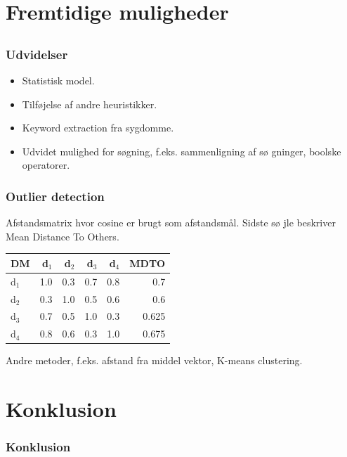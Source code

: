 \documentclass[xcolor=table]{beamer}
\begin{document}
\section{Fremtidige muligheder}

\subsection*{}

\begin{frame}

  \frametitle{Udvidelser}

  \begin{itemize}
    \item Statistisk model.
    \item Tilf\o jelse af andre heuristikker.
    \item Keyword extraction fra sygdomme.
    \item Udvidet mulighed for s\o gning, f.eks. sammenligning af s\o
      gninger, boolske operatorer.
  \end{itemize}

\end{frame}

\begin{frame}

  \frametitle{Outlier detection}

  Afstandsmatrix hvor cosine er brugt som afstandsm\aa l. Sidste s\o
  jle beskriver Mean Distance To Others.

  \begin{center}
    \begin{tabular}{|l|r|r|r|r|r|}
      \hline
      DM    & d$_1$ & d$_2$ & d$_3$ & d$_4$ & MDTO \\
      \hline
      d$_1$ &   1.0 &   0.3 &   0.7 &   0.8 & 0.7 \\
      \hline
      d$_2$ &   0.3 &   1.0 &   0.5 &   0.6 & 0.6 \\
      \hline
      d$_3$ &   0.7 &   0.5 &   1.0 &   0.3 & 0.625 \\
      \hline
      d$_4$ &   0.8 &   0.6 &   0.3 &   1.0 & 0.675 \\
      \hline
    \end{tabular}
  \end{center}


  Andre metoder, f.eks. afstand fra middel vektor, K-means
  clustering.

\end{frame}

\section{Konklusion}

\begin{frame}

  \frametitle{Konklusion}

\end{frame}
\end{document}
